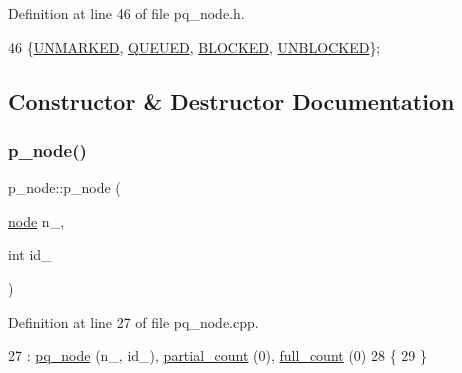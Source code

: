 Definition at line 46 of file pq\+\_\+node.\+h.


\begin{DoxyCode}
46 \{\mbox{\hyperlink{classpq__node_a6236b20cd5f6cc02cb5f637ed34c96d9a7fbe5f6a363f9f2b5a154c61b2389d59}{UNMARKED}}, \mbox{\hyperlink{classpq__node_a6236b20cd5f6cc02cb5f637ed34c96d9a8fcc16097c37da3379fcd0a0c16fe169}{QUEUED}}, \mbox{\hyperlink{classpq__node_a6236b20cd5f6cc02cb5f637ed34c96d9a70312622ded9f04f068838ec195fc53c}{BLOCKED}}, \mbox{\hyperlink{classpq__node_a6236b20cd5f6cc02cb5f637ed34c96d9a8a88820f8cee58f43fef7160cdf1d7dc}{UNBLOCKED}}\};
\end{DoxyCode}


\subsection{Constructor \& Destructor Documentation}
\mbox{\label{classp__node_aeaaa3a6bac1f72214880508f2d653939}} 
\subsubsection{\texorpdfstring{p\+\_\+node()}{p\_node()}\hspace{0.1cm}{\footnotesize\ttfamily [1/2]}}
{\footnotesize\ttfamily p\+\_\+node\+::p\+\_\+node (\begin{DoxyParamCaption}\item[{\mbox{\hyperlink{classnode}{node}}}]{n\+\_\+,  }\item[{int}]{id\+\_\+ }\end{DoxyParamCaption})\hspace{0.3cm}{\ttfamily [private]}}



Definition at line 27 of file pq\+\_\+node.\+cpp.


\begin{DoxyCode}
27                                 : \mbox{\hyperlink{classpq__node_a75720c94fd6e2865ba24c76ff66b33b2}{pq\_node}} (n\_, id\_), \mbox{\hyperlink{classp__node_a9ac93f9a0f474dcc74312e820fde73b6}{partial\_count}} (0), 
      \mbox{\hyperlink{classp__node_a67a7570ace6b26d3bcbff7cf71c85cb0}{full\_count}} (0)
28 \{
29 \}
\end{DoxyCode}
\mbox{\label{classp__node_a043eab88f783cf3e3928fa1986a91ff6}} 
